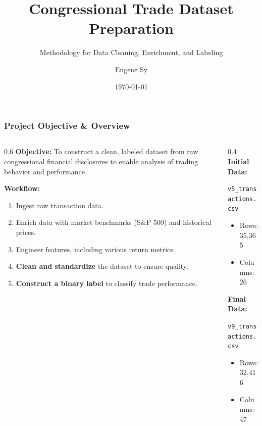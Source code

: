 \documentclass[aspectratio=169]{beamer}
\title{Congressional Trade Dataset Preparation}
\subtitle{Methodology for Data Cleaning, Enrichment, and Labeling}
\author{Eugene Sy}
\institute{National Taiwan University}
\date{\today}
\begin{document}
\begin{frame}
    \titlepage
\end{frame}

\begin{frame}
    \frametitle{Project Objective & Overview}
    \begin{columns}
        \begin{column}{0.6\textwidth}
            \textbf{Objective:} To construct a clean, labeled dataset from raw congressional financial disclosures to enable analysis of trading behavior and performance.

            \vspace{1em}
            \textbf{Workflow:}
            \begin{enumerate}
                \item Ingest raw transaction data.
                \item Enrich data with market benchmarks (S&P 500) and historical prices.
                \item Engineer features, including various return metrics.
                \item \textbf{Clean and standardize} the dataset to ensure quality.
                \item \textbf{Construct a binary label} to classify trade performance.
            \end{enumerate}
        \end{column}
        \begin{column}{0.4\textwidth}
            \textbf{Initial Data:}

            \texttt{v5_transactions.csv}
            \begin{itemize}
                \item Rows: 35,365
                \item Columns: 26
            \end{itemize}
            \vspace{1em}
            \textbf{Final Data:}

            \texttt{v9_transactions.csv}
            \begin{itemize}
                \item Rows: 32,416
                \item Columns: 47
            \end{itemize}
        \end{column}
    \end{columns}
\end{frame}
\end{document}

